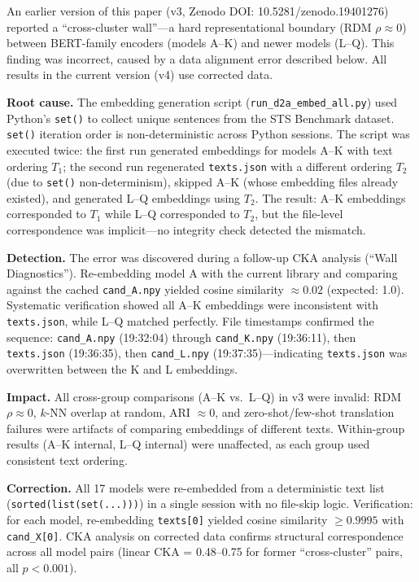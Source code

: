 \documentclass{article}
\begin{document}
An earlier version of this paper (v3, Zenodo DOI: 10.5281/zenodo.19401276) reported a ``cross-cluster wall''---a hard representational boundary (RDM $\rho \approx 0$) between BERT-family encoders (models A--K) and newer models (L--Q). This finding was incorrect, caused by a data alignment error described below. All results in the current version (v4) use corrected data.

\textbf{Root cause.} The embedding generation script (\texttt{run\_d2a\_embed\_all.py}) used Python's \texttt{set()} to collect unique sentences from the STS Benchmark dataset. \texttt{set()} iteration order is non-deterministic across Python sessions. The script was executed twice: the first run generated embeddings for models A--K with text ordering $T_1$; the second run regenerated \texttt{texts.json} with a different ordering $T_2$ (due to \texttt{set()} non-determinism), skipped A--K (whose embedding files already existed), and generated L--Q embeddings using $T_2$. The result: A--K embeddings corresponded to $T_1$ while L--Q corresponded to $T_2$, but the file-level correspondence was implicit---no integrity check detected the mismatch.

\textbf{Detection.} The error was discovered during a follow-up CKA analysis (``Wall Diagnostics''). Re-embedding model A with the current library and comparing against the cached \texttt{cand\_A.npy} yielded cosine similarity $\approx 0.02$ (expected: 1.0). Systematic verification showed all A--K embeddings were inconsistent with \texttt{texts.json}, while L--Q matched perfectly. File timestamps confirmed the sequence: \texttt{cand\_A.npy} (19:32:04) through \texttt{cand\_K.npy} (19:36:11), then \texttt{texts.json} (19:36:35), then \texttt{cand\_L.npy} (19:37:35)---indicating \texttt{texts.json} was overwritten between the K and L embeddings.

\textbf{Impact.} All cross-group comparisons (A--K vs.\ L--Q) in v3 were invalid: RDM $\rho \approx 0$, $k$-NN overlap at random, ARI $\approx 0$, and zero-shot/few-shot translation failures were artifacts of comparing embeddings of different texts. Within-group results (A--K internal, L--Q internal) were unaffected, as each group used consistent text ordering.

\textbf{Correction.} All 17 models were re-embedded from a deterministic text list (\texttt{sorted(list(set(...)))}) in a single session with no file-skip logic. Verification: for each model, re-embedding \texttt{texts[0]} yielded cosine similarity $\geq 0.9995$ with \texttt{cand\_X[0]}. CKA analysis on corrected data confirms structural correspondence across all model pairs (linear CKA = 0.48--0.75 for former ``cross-cluster'' pairs, all $p < 0.001$).
\end{document}
